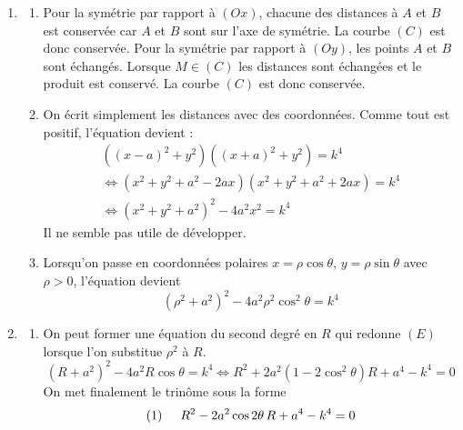 \begin{enumerate}
 \item\begin{enumerate}
 \item Pour la symétrie par rapport à $(Ox)$, chacune des distances à $A$ et $B$ est conservée car $A$ et $B$ sont sur l'axe de symétrie. La courbe $(C)$ est donc conservée. Pour la symétrie par rapport à $(Oy)$, les points $A$ et $B$ sont échangés. Lorsque $M\in (C)$ les distances sont échangées et le produit est conservé. La courbe $(C)$ est donc conservée.
\item On écrit simplement les distances avec des coordonnées. Comme tout est positif, l'équation devient :
\begin{multline*}
 \left( (x-a)^2+y^2\right)\left( (x+a)^2+y^2\right)=k^4 \\ \Leftrightarrow
\left(x^2+y^2+a^2-2ax \right)\left(x^2+y^2+a^2+2ax \right)=k^4 \\ \Leftrightarrow
(x^2+y^2+a^2)^2 -4a^2x^2=k^4 
\end{multline*}
Il ne semble pas utile de développer.
\item Lorsqu'on passe en coordonnées polaires $x=\rho\cos \theta$, $y=\rho\sin \theta$ avec $\rho>0$, l'équation devient
\begin{displaymath}
 (\rho^2+a^2)^2-4a^2\rho^2 \cos^2\theta = k^4
\end{displaymath}
\end{enumerate}
 
\item \begin{enumerate}
 \item On peut former une équation du second degré en $R$ qui redonne $(E)$ lorsque l'on substitue $\rho^2$ à $R$.
\begin{displaymath}
  (R+a^2)^2-4a^2R\cos\theta = k^4 \Leftrightarrow
R^2 +2a^2(1-2\cos^2\theta)R+a^4-k^4=0
\end{displaymath}On met finalement le trinôme sous la forme
\begin{displaymath}
  (1) \hspace{0.5cm} R^2 -2a^2\cos 2\theta\, R +a^4-k^4=0 
\end{displaymath}


\end{enumerate}
\end{enumerate}
